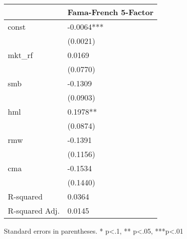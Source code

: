 \begin{table}
\caption{}
\label{}
\begin{center}
\begin{tabular}{ll}
\hline
               & Fama-French 5-Factor  \\
\hline
const          & -0.0064***            \\
               & (0.0021)              \\
mkt\_rf        & 0.0169                \\
               & (0.0770)              \\
smb            & -0.1309               \\
               & (0.0903)              \\
hml            & 0.1978**              \\
               & (0.0874)              \\
rmw            & -0.1391               \\
               & (0.1156)              \\
cma            & -0.1534               \\
               & (0.1440)              \\
R-squared      & 0.0364                \\
R-squared Adj. & 0.0145                \\
\hline
\end{tabular}
\end{center}
\end{table}
\bigskip
Standard errors in parentheses. \newline 
* p<.1, ** p<.05, ***p<.01